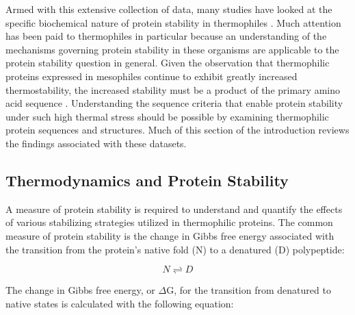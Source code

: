 
Armed with this extensive collection of data, many studies have looked at the
specific biochemical nature of protein stability in thermophiles
\cite{jaenicke1998spe,PMID_11577980,PMID_10097079,PMID_10940293,thompson1999tel,PMID_11256505}.
Much attention has been paid to thermophiles in particular because an
understanding of the mechanisms governing protein stability in these organisms
are applicable to the protein stability question in general.  Given the
observation that thermophilic proteins expressed in mesophiles continue to
exhibit greatly increased thermostability, the increased stability must be a
product of the primary amino acid sequence \cite{razvi2006lst}.  Understanding
the sequence criteria that enable protein stability under such high thermal
stress should be possible by examining thermophilic protein sequences and
structures.  Much of this section of the introduction reviews the findings
associated with these datasets.

\subsection{Thermodynamics and Protein Stability}

A measure of protein stability is required to understand and quantify the
effects of various stabilizing strategies utilized in thermophilic proteins.
The common measure of protein stability is the change in Gibbs free energy
associated with the transition from the protein's native fold (N) to a
denatured (D) polypeptide:  

\begin{equation}\label{equ}
  N \rightleftharpoons D
\end{equation}

The change in Gibbs free energy, or $\Delta$G, for the transition from denatured
to native states is calculated with the following equation:

